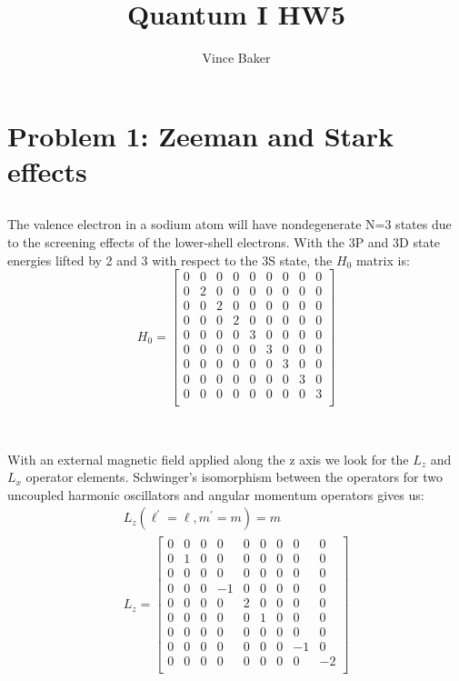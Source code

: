 \documentclass[a4paper,12pt]{article}
\title{Quantum I HW5}
\author{Vince Baker}
\numberwithin{equation}{section}
\begin{document}
\maketitle

\section{Problem 1: Zeeman and Stark effects}
\subsection{}
The valence electron in a sodium atom will have nondegenerate N=3 states due to the screening effects of the lower-shell electrons.
With the 3P and 3D state energies lifted by 2 and 3 with respect to the 3S state, the $H_0$ matrix is: 
\begin{equation}
H_0=
\begin{bmatrix}
 0 & 0 & 0 & 0 & 0 & 0 & 0 & 0 & 0 \\
 0 & 2 & 0 & 0 & 0 & 0 & 0 & 0 & 0 \\
 0 & 0 & 2 & 0 & 0 & 0 & 0 & 0 & 0 \\
 0 & 0 & 0 & 2 & 0 & 0 & 0 & 0 & 0 \\
 0 & 0 & 0 & 0 & 3 & 0 & 0 & 0 & 0 \\
 0 & 0 & 0 & 0 & 0 & 3 & 0 & 0 & 0 \\
 0 & 0 & 0 & 0 & 0 & 0 & 3 & 0 & 0 \\
 0 & 0 & 0 & 0 & 0 & 0 & 0 & 3 & 0 \\
 0 & 0 & 0 & 0 & 0 & 0 & 0 & 0 & 3 \\
\end{bmatrix}
\end{equation}
\\
\subsection{}
With an external magnetic field applied along the z axis we look for the $L_z$ and $L_x$ operator elements.
Schwinger's isomorphism between the operators for two uncoupled harmonic oscillators and angular momentum operators gives us:
\begin{gather}
L_z(\ell^{'}=\ell, m^{'}=m)=m\\
L_z=
\begin{bmatrix}
 0 & 0 & 0 & 0 & 0 & 0 & 0 & 0 & 0 \\
 0 & 1 & 0 & 0 & 0 & 0 & 0 & 0 & 0 \\
 0 & 0 & 0 & 0 & 0 & 0 & 0 & 0 & 0 \\
 0 & 0 & 0 & -1 & 0 & 0 & 0 & 0 & 0 \\
 0 & 0 & 0 & 0 & 2 & 0 & 0 & 0 & 0 \\
 0 & 0 & 0 & 0 & 0 & 1 & 0 & 0 & 0 \\
 0 & 0 & 0 & 0 & 0 & 0 & 0 & 0 & 0 \\
 0 & 0 & 0 & 0 & 0 & 0 & 0 & -1 & 0 \\
 0 & 0 & 0 & 0 & 0 & 0 & 0 & 0 & -2 \\
\end{bmatrix}
\end{gather}
\\
\end{document}
